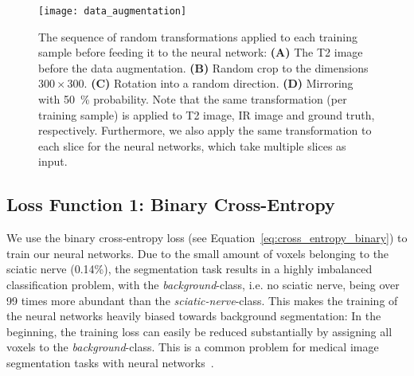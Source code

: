 \begin{figure}[htbp]	
	\texttt{[image: data\_augmentation]}
    \caption[Data Augmentation]{The sequence of random transformations applied to each training sample before feeding it to the neural network: \textbf{(A)} The T2 image  before the data augmentation. \textbf{(B)} Random crop to the dimensions $300 \times 300$. \textbf{(C)} Rotation into a random direction. \textbf{(D)} Mirroring with 50~\% probability. Note that the same transformation (per training sample) is applied to T2 image, IR image and ground truth, respectively. Furthermore, we also apply the same transformation to each slice for the neural networks, which take multiple slices as input. }
    \label{fig:data_augmentation}
\end{figure}

\subsection{Loss Function 1: Binary Cross-Entropy}
We use the binary cross-entropy loss (see Equation~\ref{eq:cross_entropy_binary}) to train our neural networks. Due to the small amount of voxels belonging to the sciatic nerve (0.14\%), the segmentation task results in a highly imbalanced classification problem, with the \textit{background}-class, i.e. no sciatic nerve, being over 99 times more abundant than the \textit{sciatic-nerve}-class. This makes the training of the neural networks heavily biased towards background segmentation: In the beginning, the training loss can easily be reduced substantially by assigning all voxels to the \textit{background}-class. This is a common problem for medical image segmentation tasks with neural networks~\cite{Litjens2017AAnalysis,Tetteh2018DeepVesselNet:Volumes,Baumgartner2017AnSegmentation,Selvan2018ExtractionNetworks,Kayalibay2017CNN-basedData}.

